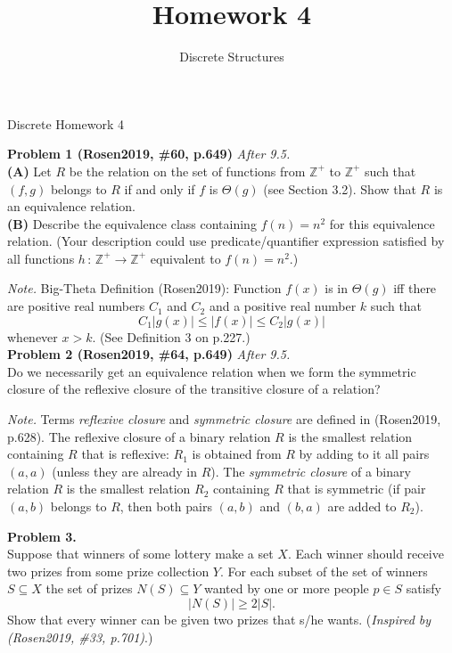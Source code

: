 \documentclass[jou]{apa6}
\title{Homework 4}
\author{Discrete Structures}
\affiliation{RBS}
\begin{document}
\thispagestyle{empty}

\twocolumn
{\Large Discrete Homework 4}


\vspace{4pt}
{\bf Problem 1 (Rosen2019, \#60, p.649)} \textendash{} {\em After 9.5.}\\
{\bf (A)} Let $R$ be the relation on the set of functions from $\mathbb{Z}^{+}$ to 
$\mathbb{Z}^{+}$ such that $(f,g)$ belongs to $R$ if and only if $f$ is
$\Theta(g)$ (see Section 3.2). Show that $R$ is an equivalence relation.\\
{\bf (B)} Describe the equivalence class containing $f(n) = n^2$ for this 
equivalence relation. (Your description could 
use predicate/quantifier expression satisfied by 
all functions $h\,:\,\mathbb{Z}^{+} \rightarrow \mathbb{Z}^{+}$ 
equivalent to $f(n) = n^2$.)

{\em Note.} Big-Theta Definition (Rosen2019): Function $f(x)$
is in $\Theta(g)$ iff there are positive real numbers $C_1$ and $C_2$ and a positive 
real number $k$ such that 
$$C_1\left| g(x) \right| \leq \left| f(x) \right| \leq C_2 \left| g(x) \right|$$
whenever $x > k$. (See Definition 3 on p.227.)\\

\vspace{6pt}
{\bf Problem 2 (Rosen2019, \#64, p.649)} \textendash{} {\em After 9.5.}\\
Do we necessarily get an equivalence relation when we form the symmetric closure of 
the reflexive closure of the transitive closure of a relation?

{\em Note.} Terms {\em reflexive closure} and {\em symmetric closure} are defined in 
(Rosen2019, p.628). The reflexive closure of a binary relation $R$ is 
the smallest relation containing $R$ that is reflexive: 
$R_1$ is obtained from $R$ by adding to it all pairs $(a,a)$ (unless they 
are already in $R$). The {\em symmetric closure} of a binary 
relation $R$ is the smallest relation $R_2$ containing $R$ that is symmetric 
(if pair $(a,b)$ belongs to $R$, then both 
pairs $(a,b)$ and $(b,a)$ are added to $R_2$). 

\vspace{6pt}
{\bf Problem 3.}\\
Suppose that winners of some lottery make a set $X$. 
Each winner should receive two prizes from some prize collection $Y$.
For each subset of the set of winners $S \subseteq X$ the set 
of prizes $N(S) \subseteq Y$ wanted by one or more people $p \in S$ satisfy 
$$|N(S)| \geq 2|S|.$$
Show that every winner can be given two prizes that s/he wants.
({\em Inspired by (Rosen2019, \#33, p.701)}.)
\end{document}
